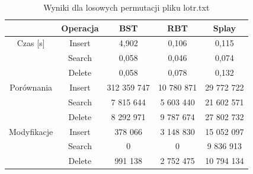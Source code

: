 \documentclass[10pt,a4paper]{article}
\theoremstyle{definition}
\theoremstyle{definition}
\theoremstyle{definition}
\begin{document}
            \begin{table}[h]
            \centering
            \caption{Wyniki dla losowych permutacji pliku lotr.txt}
            \label{tab:permutations}
            \begin{tabular}{|c|c|c|c|c|} \hline
            		 & Operacja & BST & RBT & Splay \\
            		\hline
            		Czas [s] & Insert & 4,902 & 0,106 & 0,115 \\
            		
            		& Search & 0,058 & 0,046 & 0,074 \\
            	
            		& Delete & 0,058 & 0,078 & 0,132 \\
            		\hline
            		Porównania & Insert & 312 359 747 & 10 780 871 & 29 772 722 \\
            		& Search & 7 815 644 & 5 603 440 & 21 602 571 \\
            		& Delete & 8 292 971 & 9 787 674 & 27 802 732 \\
            		\hline
            		Modyfikacje & Insert & 378 066 & 3 148 830 & 15 052 097 \\
            		& Search & 0 & 0 & 9 836 913 \\
            		& Delete & 991 138 & 2 752 475 & 10 794 134 \\
            		\hline 
            \end{tabular}
            \end{table}
            
            		
            	
            
\end{document}
